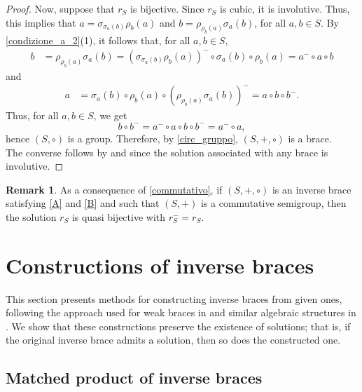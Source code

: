 \documentclass[preprint,1p]{elsarticle}
\theoremstyle{definition}               %
\newtheorem{rem}[theor]{Remark}
\begin{document}
\begin{proof}
    Now, suppose that $r_S$ is bijective. Since $r_S$ is cubic, it is involutive. Thus, this implies that $a=\sigma_{\sigma_a(b)}\rho_b(a)$ and $b=\rho_{\rho_b(a)}\sigma_a(b)$, for all $a, b \in S$.
    By \cref{condizione_a_2}(1), it follows that, for all $a,b \in S,$
    \begin{align*}
        b&=\rho_{\rho_b(a)}\sigma_a(b)=\left(\sigma_{\sigma_a(b)}\rho_b(a)\right)^-\circ \sigma_a(b)\circ \rho_b(a) %
        =a^-\circ a\circ b
    \end{align*}
and
    \begin{align*}
        a&=\sigma_a(b)\circ\rho_b(a)\circ \left(\rho_{\rho_b(a)}\sigma_a(b)\right)^-=a\circ b \circ b^-.
    \end{align*}
   Thus, for all $a,b \in S$, we get
    \[b\circ b^-=a^-\circ a\circ b \circ b^-=a^-\circ a,\]
     hence $(S,\circ)$ is a group.
    Therefore, by \cref{circ_gruppo}, $(S,+,\circ)$ is a brace.\\
    The converse follows by \cite{Ru07} and \cite[Lemma 2]{CeJeOk14} since the solution associated with any brace is involutive.
\end{proof}


\smallskip

\begin{rem}
    As a consequence of \cref{commutativo}, if $(S,+,\circ)$ is an inverse brace satisfying \eqref{A} and \eqref{B} and such that $(S,+)$ is
    a commutative semigroup, then the solution $r_S$ is quasi bijective with $r_S^-=r_S$.
\end{rem}



\medskip


\section{Constructions of inverse braces}
This section presents methods for constructing inverse braces from given ones, following the approach used for weak braces in \cite[Section 4]{CaMaMiSt22} and similar algebraic structures in \cite{CaMaSt21}. We show that these constructions preserve the existence of solutions; that is, if the original inverse brace admits a solution, then so does the constructed one.

\medskip

\subsection{Matched product of inverse braces}
\end{document}
